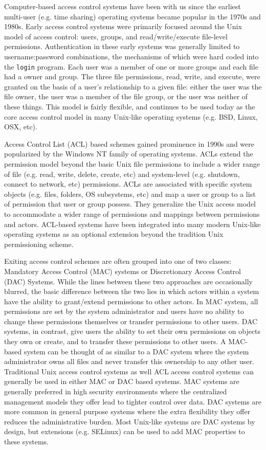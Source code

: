 Computer-based access control systems have been with us since the
earliest multi-user (e.g. time sharing) operating systems became
popular in the 1970s and 1980s. Early access control systems were
primarily focused around the Unix model of access control: users,
groups, and read/write/execute file-level permissions. Authentication
in these early systems was generally limited to username:password
combinations, the mechanisms of which were hard coded into the
\texttt{login} program. Each user was a member of one or more groups
and each file had a owner and group. The three file permissions, read,
write, and execute, were granted on the basis of a user's relationship
to a given file: either the user was the file owner, the user was a
member of the file group, or the user was neither of these
things. This model is fairly flexible, and continues to be used today
as the core access control model in many Unix-like operating systems
(e.g. BSD, Linux, OSX, etc).

Access Control List (ACL) based schemes gained prominence in 1990s and
were popularized by the Windows NT family of operating systems. ACLs
extend the permission model beyond the basic Unix file permissions to
include a wider range of file (e.g. read, write, delete, create, etc)
and system-level (e.g. shutdown, connect to network, etc)
permissions. ACLs are associated with specific system objects
(e.g. files, folders, OS subsystems, etc) and map a user or group to a
list of permission that user or group possess. They generalize the
Unix access model to accommodate a wider range of permissions and
mappings between permissions and actors. ACL-based systems have been
integrated into many modern Unix-like operating systems as an optional
extension beyond the tradition Unix permissioning scheme.

Exiting access control schemes are often grouped into one of two
classes: Mandatory Access Control (MAC) systems or Discretionary
Access Control (DAC) Systems. While the lines between these two
approaches are occasionally blurred, the basic difference between the
two lies in which actors within a system have the ability to
grant/extend permissions to other actors. In MAC system, all
permissions are set by the system administrator and users have no
ability to change these permissions themselves or transfer permissions
to other users. DAC systems, in contrast, give users the ability to
set their own permissions on objects they own or create, and to
transfer these permissions to other users. A MAC-based system can be
thought of as similar to a DAC system where the system administrator
owns all files and never transfer this ownership to any other
user. Traditional Unix access control systems as well ACL access
control systems can generally be used in either MAC or DAC based
systems. MAC systems are generally preferred in high security
environments where the centralized management models they offer lead
to tighter control over data. DAC systems are more common in general
purpose systems where the extra flexibility they offer reduces the
administrative burden. Most Unix-like systems are DAC systems by
design, but extensions (e.g. SELinux) can be used to add MAC
properties to these systems.


